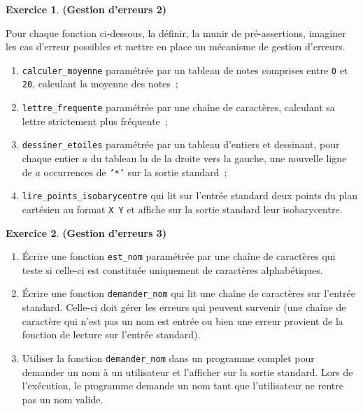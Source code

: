 \documentclass[12pt]{article}
\theoremstyle{definition}
\newtheorem{Exercice}{Exercice}
\begin{document}
\begin{Exercice} {\bf (Gestion d'erreurs 2)}\smallskip

Pour chaque fonction ci-dessous, la définir, la munir de pré-assertions,
imaginer les cas d'erreur possibles et mettre en place un mécanisme de
gestion d'erreurs.

\begin{enumerate}
    \item {\tt calculer\_moyenne} paramétrée par 
    un tableau de notes comprises entre {\tt 0} et {\tt 20}, calculant 
    la moyenne des notes~;
    \smallskip
    
    \item {\tt lettre\_frequente} paramétrée par une chaîne de caractères,
    calculant sa lettre strictement plus fréquente~;
    \smallskip
    
    \item {\tt dessiner\_etoiles} paramétrée par un tableau d'entiers 
    et dessinant, pour chaque entier $a$ du tableau lu de la droite vers 
    la gauche, une nouvelle ligne de $a$ occurrences de {\tt '*'} sur la 
    sortie standard~;
    \smallskip
    
    \item {\tt lire\_points\_isobarycentre} qui lit sur l'entrée standard 
    deux points du plan cartésien au format {\tt X Y} et affiche sur 
    la sortie standard leur isobarycentre.
\end{enumerate}
\end{Exercice}
\bigskip

\begin{Exercice} {\bf (Gestion d'erreurs 3)}\smallskip
\begin{enumerate}
    \item Écrire une fonction {\tt est\_nom} paramétrée par une 
    chaîne de caractères qui teste si celle-ci est constituée uniquement 
    de caractères alphabétiques.
    \smallskip
    
    \item Écrire une fonction {\tt demander\_nom} qui lit une chaîne 
    de caractères sur l'entrée standard. Celle-ci doit gérer les erreurs
    qui peuvent survenir (une chaîne de caractère qui n'est pas un nom 
    est entrée ou bien une erreur provient de la fonction de lecture sur 
    l'entrée standard).
    \smallskip
    
    \item Utiliser la fonction {\tt demander\_nom} dans un programme 
    complet pour demander un nom à un utilisateur et l'afficher sur 
    la sortie standard. Lors de l'exécution, le programme demande un nom
    tant que l'utilisateur ne rentre pas un nom valide.
\end{enumerate}
\end{Exercice}
\bigskip
\end{document}
